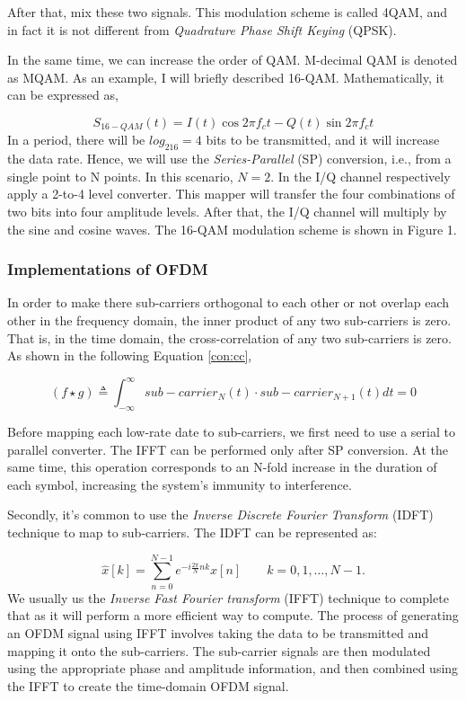 \documentclass[11pt]{article}
\numberwithin{figure}{section}
\numberwithin{equation}{section}
\begin{document}
After that, mix these two signals. This modulation scheme is called 4QAM, and in fact it is not different from \textit{Quadrature Phase Shift Keying} (QPSK).

In the same time, we can increase the order of QAM. M-decimal QAM is denoted as MQAM. As an example, I will briefly described 16-QAM. Mathematically, it can be expressed as,

\begin{equation}
S_{16-QAM}(t) = I(t)\cos{2\pi f_ct}-Q(t)\sin{2\pi f_ct} \label{con:16-QAM}
\end{equation}
In a period, there will be $log_216=4$ bits to be transmitted, and it will increase the data rate. Hence, we will use the \textit{Series-Parallel} (SP) conversion, i.e., from a single point to N points. In this scenario, $N=2$. In the I/Q channel respectively apply a 2-to-4 level converter. This mapper will transfer the four combinations of two bits into four amplitude levels. After that, the I/Q channel will multiply by the sine and cosine waves. The 16-QAM modulation scheme is shown in Figure 1.

\subsubsection{Implementations of OFDM}

In order to make there sub-carriers orthogonal to each other or not overlap each other in the frequency domain, the inner product of any two sub-carriers is zero. That is, in the time domain, the cross-correlation of any two sub-carriers is zero. As shown in the following Equation \ref{con:cc},

\begin{equation}
(f \star g) \triangleq \int_{-\infty}^{\infty} sub-carrier_N(t) \cdot sub-carrier_{N+1}(t)dt=0 \label{con:cc}
\end{equation}

Before mapping each low-rate date to sub-carriers, we first need to use a serial to parallel converter. The IFFT can be performed only after SP conversion. At the same time, this operation corresponds to an N-fold increase in the duration of each symbol, increasing the system's immunity to interference.

Secondly, it's common to use the \textit{Inverse Discrete Fourier Transform} (IDFT) technique to map to sub-carriers. The IDFT can be represented as: 

\begin{equation}
\hat{x}[k]=\sum_{n=0}^{N-1} e^{-i\frac{2\pi}{N}nk}x[n] \qquad k = 0,1,\ldots,N-1. \label{con:idft}
\end{equation}
We usually us the \textit{Inverse Fast Fourier transform} (IFFT) technique to complete that as it will perform a more efficient way to compute. The process of generating an OFDM signal using IFFT involves taking the data to be transmitted and mapping it onto the sub-carriers. The sub-carrier signals are then modulated using the appropriate phase and amplitude information, and then combined using the IFFT to create the time-domain OFDM signal. 
\end{document}
